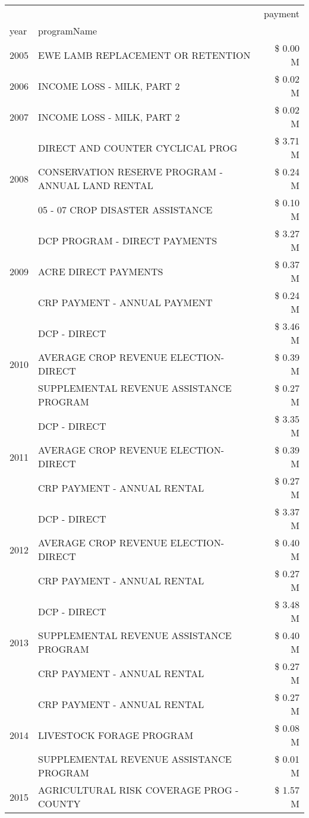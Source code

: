\begin{tabular}{llr}
\toprule
 &  & payment \\
year & programName &  \\
\midrule
2005 & EWE LAMB REPLACEMENT OR RETENTION & \$ 0.00 M \\
\cline{1-3}
2006 & INCOME LOSS - MILK, PART 2 & \$ 0.02 M \\
\cline{1-3}
2007 & INCOME LOSS - MILK, PART 2 & \$ 0.02 M \\
\cline{1-3}
\multirow[t]{3}{*}{2008} & DIRECT AND COUNTER CYCLICAL PROG & \$ 3.71 M \\
 & CONSERVATION RESERVE PROGRAM - ANNUAL LAND RENTAL & \$ 0.24 M \\
 & 05 - 07 CROP DISASTER ASSISTANCE & \$ 0.10 M \\
\cline{1-3}
\multirow[t]{3}{*}{2009} & DCP PROGRAM - DIRECT PAYMENTS & \$ 3.27 M \\
 & ACRE DIRECT PAYMENTS & \$ 0.37 M \\
 & CRP PAYMENT - ANNUAL PAYMENT & \$ 0.24 M \\
\cline{1-3}
\multirow[t]{3}{*}{2010} & DCP - DIRECT & \$ 3.46 M \\
 & AVERAGE CROP REVENUE ELECTION-DIRECT & \$ 0.39 M \\
 & SUPPLEMENTAL REVENUE ASSISTANCE PROGRAM & \$ 0.27 M \\
\cline{1-3}
\multirow[t]{3}{*}{2011} & DCP - DIRECT & \$ 3.35 M \\
 & AVERAGE CROP REVENUE ELECTION-DIRECT & \$ 0.39 M \\
 & CRP PAYMENT - ANNUAL RENTAL & \$ 0.27 M \\
\cline{1-3}
\multirow[t]{3}{*}{2012} & DCP - DIRECT & \$ 3.37 M \\
 & AVERAGE CROP REVENUE ELECTION-DIRECT & \$ 0.40 M \\
 & CRP PAYMENT - ANNUAL RENTAL & \$ 0.27 M \\
\cline{1-3}
\multirow[t]{3}{*}{2013} & DCP - DIRECT & \$ 3.48 M \\
 & SUPPLEMENTAL REVENUE ASSISTANCE PROGRAM & \$ 0.40 M \\
 & CRP PAYMENT - ANNUAL RENTAL & \$ 0.27 M \\
\cline{1-3}
\multirow[t]{3}{*}{2014} & CRP PAYMENT - ANNUAL RENTAL & \$ 0.27 M \\
 & LIVESTOCK FORAGE PROGRAM & \$ 0.08 M \\
 & SUPPLEMENTAL REVENUE ASSISTANCE PROGRAM & \$ 0.01 M \\
\cline{1-3}
\multirow[t]{3}{*}{2015} & AGRICULTURAL RISK COVERAGE PROG - COUNTY & \$ 1.57 M \\

\end{tabular}
